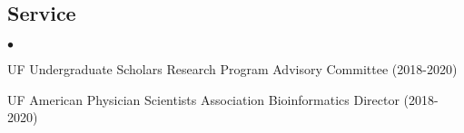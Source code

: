 \documentclass[margin,centered]{res}
\newenvironment{list1}{
  \begin{list}{\ding{113}}{%
      \setlength{\itemsep}{0in}
      \setlength{\parsep}{0in} \setlength{\parskip}{0in}
      \setlength{\topsep}{0in} \setlength{\partopsep}{0in}
      \setlength{\leftmargin}{0.17in}}}{\end{list}}
\newenvironment{list2}{
  \begin{list}{$\bullet$}{%
      \setlength{\itemsep}{0in}
      \setlength{\parsep}{0in} \setlength{\parskip}{0in}
      \setlength{\topsep}{0in} \setlength{\partopsep}{0in}
      \setlength{\leftmargin}{0.2in}}}{\end{list}}
\begin{document}
\begin{resume}
\section{\sc Service}

\begin{list1}
\item[]
\begin{list2}
\vspace*{.05in}
\item UF Undergraduate Scholars Research Program Advisory Committee (2018-2020)
\item UF American Physician Scientists Association Bioinformatics Director (2018-2020)
\end{list2}
\end{list1}






%
\thispagestyle{lastpage}
\end{resume}
\end{document}
